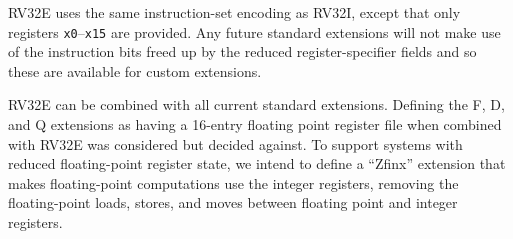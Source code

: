 RV32E uses the same instruction-set encoding as RV32I, except that
only registers {\tt x0}--{\tt x15} are provided.  Any future standard
extensions will not make use of the instruction bits freed up by the
reduced register-specifier fields and so these are available for
custom extensions.

\begin{commentary}
RV32E can be combined with all current standard extensions. Defining the F, D,
and Q extensions as having a 16-entry floating point register file when
combined with RV32E was considered but decided against. To support
systems with reduced floating-point register state, we intend to
define a ``Zfinx'' extension that makes floating-point computations use the
integer registers, removing the floating-point loads, stores, and moves between
floating point and integer registers.
\end{commentary}
